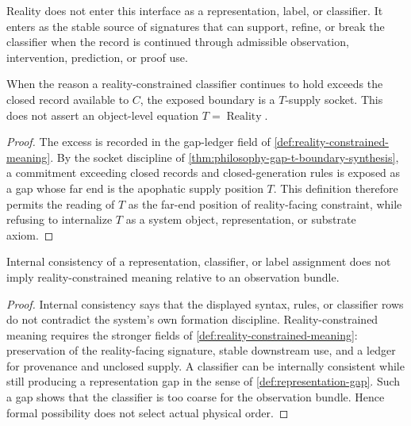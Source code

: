 \begin{principle}
\label{prin:reality-as-meaning-constraint}
Reality does not enter this interface as a representation, label, or
classifier. It enters as the stable source of signatures that can
support, refine, or break the classifier when the record is continued
through admissible observation, intervention, prediction, or proof use.
\end{principle}

\begin{corollary}
\label{cor:meaning-t-supply-not-object-equation}
When the reason a reality-constrained classifier continues to hold
exceeds the closed record available to $C$, the exposed boundary is a
$T$-supply socket. This does not assert an object-level equation
$T=\operatorname{Reality}$.
\end{corollary}
\begin{proof}
The excess is recorded in the gap-ledger field of
\autoref{def:reality-constrained-meaning}. By the socket discipline of
\autoref{thm:philosophy-gap-t-boundary-synthesis}, a commitment
exceeding closed records and closed-generation rules is exposed as a
gap whose far end is the apophatic supply position $T$. This definition
therefore permits the reading of $T$ as the far-end position
of reality-facing constraint, while refusing to internalize $T$ as a
system object, representation, or substrate axiom.
\end{proof}

\begin{theorem}
\label{thm:formal-consistency-not-actuality}
Internal consistency of a representation, classifier, or label
assignment does not imply reality-constrained meaning relative to an
observation bundle.
\end{theorem}
\begin{proof}
Internal consistency says that the displayed syntax, rules, or
classifier rows do not contradict the system's own formation
discipline. Reality-constrained meaning requires the stronger fields
of \autoref{def:reality-constrained-meaning}: preservation of the
reality-facing signature, stable downstream use, and a ledger for
provenance and unclosed supply. A classifier can be internally
consistent while still producing a representation gap in the sense of
\autoref{def:representation-gap}. Such a gap shows that the classifier
is too coarse for the observation bundle. Hence formal possibility
does not select actual physical order.
\end{proof}

